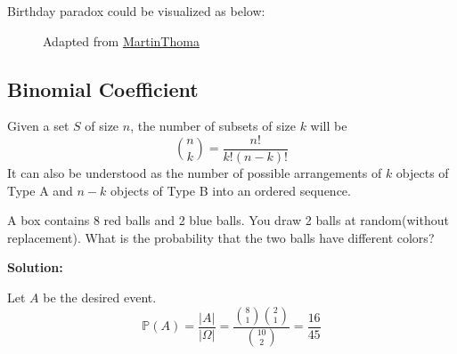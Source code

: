 Birthday paradox could be visualized as below:
\begin{figure}[H]
\caption*{Adapted from \href{https://github.com/MartinThoma/LaTeX-examples/tree/2286e6e3833904b2c058b2a855db9b7f81776c59/tikz/birthday-paradox}{MartinThoma}}
\end{figure}

\subsection{Binomial Coefficient}
\begin{proposition}
    Given a set \(S\) of size \(n\), the number of subsets of size \(k\) will be 
    \[
        \binom{n}{k} = \dfrac{n!}{k!(n-k)!}
    \]
    It can also be understood as the number of possible arrangements of \(k\) objects of Type A and \(n - k\) objects of Type B into an ordered sequence.
\end{proposition}

\begin{eg}
    A box contains 8 red balls and 2 blue balls. You draw 2 balls at random(without replacement). What is the probability that the two balls have different colors?

    \textbf{Solution:}
    
    Let \(A\) be the desired event.
    \[
        \mathbb{P}(A) = \dfrac{\vert A \vert}{\vert \Omega \vert} = \dfrac{\binom{8}{1}\binom{2}{1}}{\binom{10}{2}} = \dfrac{16}{45}
    \]
\end{eg}

